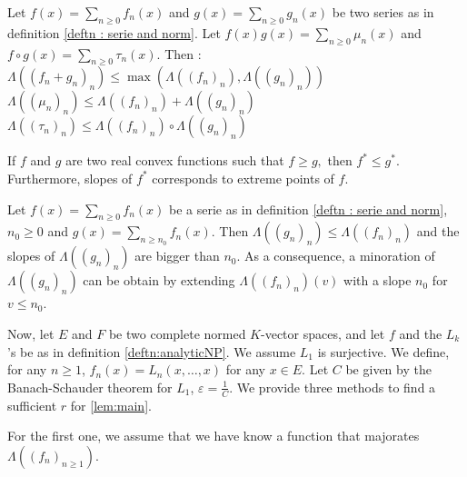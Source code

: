 \documentclass{lms}
\begin{document}
\begin{cor} Let $f(x)= \sum_{n \geq 0} f_n (x)$ and $g(x)= \sum_{n \geq 0} g_n (x)$ be two series as in definition \ref{deftn :  serie and norm}. Let $f(x)g(x)=\sum_{n \geq 0} \mu_n (x) $ and $f \circ g(x)=\sum_{n \geq 0} \tau_n (x) .$ Then :
$\Lambda((f_n+g_n)_n) \leq \max (\Lambda((f_n)_n),\Lambda((g_n)_n))$
$\Lambda((\mu_n)_n) \leq \Lambda((f_n)_n)+\Lambda((g_n)_n)$
$\Lambda((\tau_n)_n) \leq \Lambda((f_n)_n) \circ \Lambda((g_n)_n)$
\end{cor}

\begin{prop} \label{prop : legendre transform}
If $f$ and $g$ are two real convex functions such that $f \geq g,$ then $f^* \leq g^*.$
Furthermore, slopes of $f^*$ corresponds to extreme points of $f$.
\end{prop}

\begin{cor} \label{cor : trunc series}
Let $f(x)= \sum_{n \geq 0} f_n (x)$ be a serie as in definition \ref{deftn :  serie and norm}, $n_0 \geq 0$ and $g(x)= \sum_{n \geq n_0} f_n (x).$ Then $\Lambda((g_n)_n) \leq \Lambda((f_n)_n)$ and the slopes of $\Lambda((g_n)_n)$ are bigger than $n_0$. 
As a consequence, a minoration of $\Lambda((g_n)_n)$ can be obtain by extending $\Lambda((f_n)_n)(v)$ with a slope $n_0$ for $v \leq n_0$.
\end{cor}


Now, let $E$ and $F$ be two complete normed $K$-vector spaces, and let $f$ and the $L_k$'s be as in definition \ref{deftn:analyticNP}. We assume $L_1$ is surjective. We define, for any $n \geq 1$, $f_n(x)=L_n(x,\dots,x)$ for any $x \in E.$ 
Let $C$ be given by the Banach-Schauder theorem for $L_1$, $\varepsilon = \frac{1}{C}$. We provide three methods to find a sufficient $r$ for \ref{lem:main}.

For the first one, we assume that we have know a function that majorates $\Lambda((f_n)_{n \geq 1})$.
\end{document}
